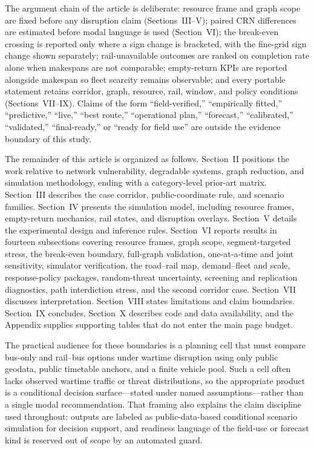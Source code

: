 \documentclass{ieeeaccess}
\begin{document}
The argument chain of the article is deliberate: resource frame and graph scope are fixed before any disruption claim (Sections~III--V); paired CRN differences are estimated before modal language is used (Section~VI); the break-even crossing is reported only where a sign change is bracketed, with the fine-grid sign change shown separately; rail-unavailable outcomes are ranked on completion rate alone when makespans are not comparable; empty-return KPIs are reported alongside makespan so fleet scarcity remains observable; and every portable statement retains corridor, graph, resource, rail, window, and policy conditions (Sections~VII--IX). Claims of the form ``field-verified,'' ``empirically fitted,'' ``predictive,'' ``live,'' ``best route,'' ``operational plan,'' ``forecast,'' ``calibrated,'' ``validated,'' ``final-ready,'' or ``ready for field use'' are outside the evidence boundary of this study.

The remainder of this article is organized as follows. Section~II positions the work relative to network vulnerability, degradable systems, graph reduction, and simulation methodology, ending with a category-level prior-art matrix. Section~III describes the case corridor, public-coordinate rule, and scenario families. Section~IV presents the simulation model, including resource frames, empty-return mechanics, rail states, and disruption overlays. Section~V details the experimental design and inference rules. Section~VI reports results in fourteen subsections covering resource frames, graph scope, segment-targeted stress, the break-even boundary, full-graph validation, one-at-a-time and joint sensitivity, simulator verification, the road--rail map, demand--fleet and scale, response-policy packages, random-threat uncertainty, screening and replication diagnostics, path interdiction stress, and the second corridor case. Section~VII discusses interpretation. Section~VIII states limitations and claim boundaries. Section~IX concludes, Section~X describes code and data availability, and the Appendix supplies supporting tables that do not enter the main page budget.

The practical audience for these boundaries is a planning cell that must compare bus-only and rail--bus options under wartime disruption using only public geodata, public timetable anchors, and a finite vehicle pool. Such a cell often lacks observed wartime traffic or threat distributions, so the appropriate product is a conditional decision surface---stated under named assumptions---rather than a single modal recommendation. That framing also explains the claim discipline used throughout: outputs are labeled as public-data-based conditional scenario simulation for decision support, and readiness language of the field-use or forecast kind is reserved out of scope by an automated guard.
\end{document}
